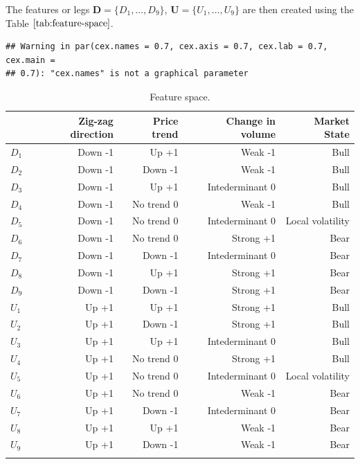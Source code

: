 \documentclass[]{article}
\newcommand{\mat}[1]{\bm{#1}}
\begin{document}
The features or legs \(\mat{D} = \{D_1, \dots, D_9 \}\),
\(\mat{U} = \{U_1, \dots, U_9 \}\) are then created using the Table
\(\ref{tab:feature-space}\).

\begin{verbatim}
## Warning in par(cex.names = 0.7, cex.axis = 0.7, cex.lab = 0.7, cex.main =
## 0.7): "cex.names" is not a graphical parameter
\end{verbatim}

\begin{table}[ht]
\centering
\begingroup\footnotesize
\begin{tabularx}{0.8 \textwidth}{lRRRR}
  \toprule
 & Zig-zag direction & Price trend & Change in volume & Market State \\ 
  \midrule
$D_{1}$ & Down -1 & Up +1 & Weak -1 & Bull \\ 
  $D_{2}$ & Down -1 & Down -1 & Weak -1 & Bull \\ 
  $D_{3}$ & Down -1 & Up +1 & Intederminant  0 & Bull \\ 
  $D_{4}$ & Down -1 & No trend  0 & Weak -1 & Bull \\ 
  $D_{5}$ & Down -1 & No trend  0 & Intederminant  0 & Local volatility \\ 
  $D_{6}$ & Down -1 & No trend  0 & Strong +1 & Bear \\ 
  $D_{7}$ & Down -1 & Down -1 & Intederminant  0 & Bear \\ 
  $D_{8}$ & Down -1 & Up +1 & Strong +1 & Bear \\ 
  $D_{9}$ & Down -1 & Down -1 & Strong +1 & Bear \\ 
   \midrule
$U_{1}$ & Up +1 & Up +1 & Strong +1 & Bull \\ 
  $U_{2}$ & Up +1 & Down -1 & Strong +1 & Bull \\ 
  $U_{3}$ & Up +1 & Up +1 & Intederminant  0 & Bull \\ 
  $U_{4}$ & Up +1 & No trend  0 & Strong +1 & Bull \\ 
  $U_{5}$ & Up +1 & No trend  0 & Intederminant  0 & Local volatility \\ 
  $U_{6}$ & Up +1 & No trend  0 & Weak -1 & Bear \\ 
  $U_{7}$ & Up +1 & Down -1 & Intederminant  0 & Bear \\ 
  $U_{8}$ & Up +1 & Up +1 & Weak -1 & Bear \\ 
  $U_{9}$ & Up +1 & Down -1 & Weak -1 & Bear \\ 
   \bottomrule
{}\\
\end{tabularx}
\endgroup
\caption{Feature space.} 
\label{tab:feature-space}
\end{table}
\end{document}
